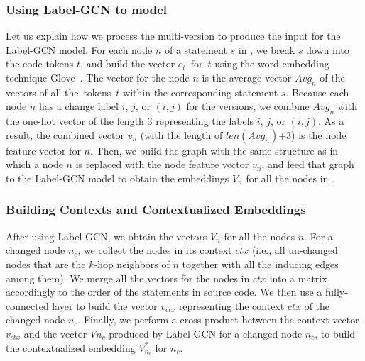 \subsubsection{{\bf Using Label-GCN to model {\mvpdg}}}
\label{sec:preprocess}
Let us explain how we process the multi-version {\mvpdg} to produce
the input for the Label-GCN model. For each node $n$ of a statement
$s$ in {\mvpdg}, we break $s$ down into the code tokens $t$, and build
the vector $e_t$~for~$t$ using the word embedding technique
Glove~\cite{glove2014}. The vector for the node $n$ is the average vector
$Avg_n$ of the vectors of all the~tokens~$t$ within the corresponding
statement $s$. Because each node $n$ has a change label $i$, $j$, or
$(i,j)$ for the versions, we combine $Avg_n$ with the one-hot vector
of the length 3 representing the labels $i$, $j$, or $(i,j)$. As a
result, the combined vector $v_n$ (with the length of $len(Avg_n)$+3)
is the node feature vector for $n$. Then, we build the graph with the
same structure as {\mvpdg} in which a node $n$ is replaced with the
node feature vector $v_n$, and feed that graph to the Label-GCN model to obtain
the embeddings $V_n$ for all the nodes in {\mvpdg}.




\subsubsection{{\bf Building Contexts and Contextualized Embeddings}}
After using Label-GCN, we obtain the vectors $V_n$ for all the nodes
$n$. For a changed node $n_c$, we collect the nodes in its context
$ctx$ (i.e., all un-changed nodes that are the $k$-hop neighbors of $n$
together with all the inducing edges among them). We merge all the
vectors for the nodes in $ctx$ into a matrix accordingly to the order
of the statements in source code. We then use a fully-connected layer
to build the vector $v_{ctx}$ representing the context $ctx$ of the
changed node $n_c$.
%
Finally, we perform a cross-product between the context vector $v_{ctx}$ and
the vector $V{n_c}$ produced by Label-GCN for a changed node $n_c$, to
build the contextualized embedding $V^{*}_{n_c}$ for $n_c$.

